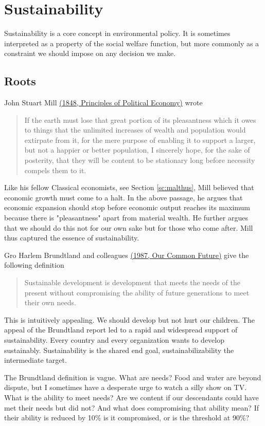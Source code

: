 \chapter{Sustainability}
\label{ch:sustainability}
Sustainability is a core concept in environmental policy. It is sometimes interpreted as a property of the social welfare function, but more commonly as a constraint we should impose on any decision we make.

\section{Roots}
John Stuart Mill \href{https://www.gutenberg.org/files/30107/30107-pdf.pdf}{(1848, Principles of Political Economy)} wrote
\begin{quote}
    If the earth must lose that great portion of its pleasantness which it owes to things that the unlimited increases of wealth and population would extirpate from it, for the mere purpose of enabling it to support a larger, but not a happier or better population, I sincerely hope, for the sake of posterity, that they will be content to be stationary long before necessity compels them to it.
\end{quote}
Like his fellow Classical economists, see Section \ref{sc:malthus}, Mill believed that economic growth must come to a halt. In the above passage, he argues that economic expansion should stop before economic output reaches its maximum because there is "pleasantness" apart from material wealth. He further argues that we should do this not for our own sake but for those who come after. Mill thus captured the essence of sustainability.

Gro Harlem Brundtland and colleagues \href{https://sustainabledevelopment.un.org/content/documents/5987our-common-future.pdf}{(1987, Our Common Future)} give the following definition
\begin{quote}
    Sustainable development is development that meets the needs of the present without compromising the ability of future generations to meet their own needs.
\end{quote}
This is intuitively appealing. We should develop but not hurt our children. The appeal of the Brundtland report led to a rapid and widespread support of sustainability. Every country and every organization wants to develop sustainably. Sustainability is the shared end goal, sustainabilizability the intermediate target.

The Brundtland definition is vague. What are needs? Food and water are beyond dispute, but I sometimes have a desperate urge to watch a silly show on TV. What is the ability to meet needs? Are we content if our descendants could have met their needs but did not? And what does compromising that ability mean? If their ability is reduced by 10\% is it compromised, or is the threshold at 90\%?

